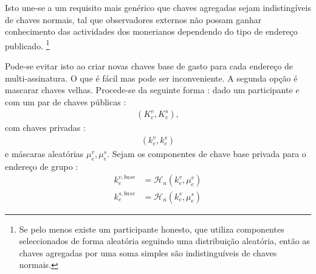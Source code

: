 Isto une-se a um requisito mais genérico que chaves agregadas sejam indistingíveis de chaves normais, tal que observadores externos não possam ganhar conhecimento das actividades dos monerianos dependendo do tipo de endereço publicado.
\footnote{Se pelo menos existe um participante honesto, que utiliza componentes seleccionados de forma aleatória seguindo uma distribuição aleatória, então as chaves agregadas por uma soma simples são indistinguíveis \cite{SCOZZAFAVA1993313} de chaves normais.}

Pode-se evitar isto ao criar novas chaves base de gasto para cada endereço de multi-assinatura. O que é fácil mas pode ser inconveniente. A segunda opção é mascarar chaves velhas. 
Procede-se da seguinte forma : \newline dado um participante $e$ com um par de chaves públicas : 
\begin{align*}
(K^v_e,K^s_e) ,
\end{align*}
com chaves privadas :
\begin{align*}
(k^v_e,k^s_e)
\end{align*}
e máscaras aleatórias $\mu^v_e,\mu^s_e$. Sejam os componentes de chave base privada para o endereço de grupo :
\begin{align*}
    k^{v,base}_e &= \mathcal{H}_n(k^v_e,\mu^v_e)\\
    k^{s,base}_e &= \mathcal{H}_n(k^s_e,\mu^s_e)
\end{align*}
  
